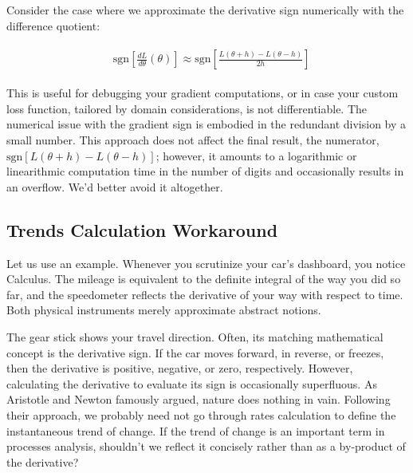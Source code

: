 \documentclass[11pt]{book}
\begin{document}
Consider the case where we approximate the derivative sign numerically with the difference quotient:

\begin{align}
&\begin{aligned}
\text{sgn}\left[\frac{dL}{d\theta}\left(\theta\right)\right]\approx \text{sgn}\left[\frac{L\left(\theta+h\right)-L\left(\theta-h\right)}{2h}\right]
\end{aligned}
\end{align}


This is useful for debugging your gradient computations, or in case your custom loss function, tailored by domain considerations, is not differentiable. The numerical issue with the gradient sign is embodied in the redundant division by a small number. This approach does not affect the final result, the numerator, $\text{sgn}\left[L\left(\theta+h\right)-L\left(\theta-h\right)\right]$; however, it amounts to a logarithmic or linearithmic computation time in the number of digits and occasionally results in an overflow. We’d better avoid it altogether.

\subsection{Trends Calculation Workaround}

Let us use an example. Whenever you scrutinize your car's dashboard, you notice Calculus. The mileage is equivalent to the definite integral of the way you did so far, and the speedometer reflects the derivative of your way with respect to time. Both physical instruments merely approximate abstract notions.

The gear stick shows your travel direction. Often, its matching mathematical concept is the derivative sign. If the car moves forward, in reverse, or freezes, then the derivative is positive, negative, or zero, respectively. However, calculating the derivative to evaluate its sign is occasionally superfluous. As Aristotle and Newton famously argued, nature does nothing in vain. Following their approach, we probably need not go through rates calculation to define the instantaneous trend of change. If the trend of change is an important term in processes analysis, shouldn't we reflect it concisely rather than as a by-product of the derivative?
\end{document}
